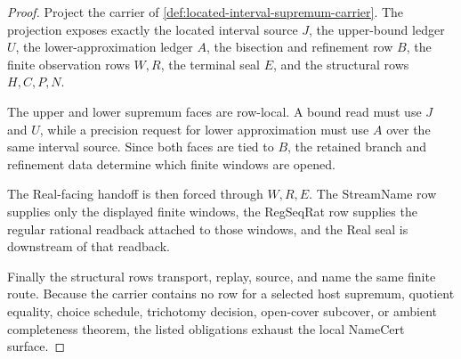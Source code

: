 \begin{proof}
Project the carrier of \autoref{def:located-interval-supremum-carrier}. The projection exposes exactly the located interval source $J$, the upper-bound ledger $U$, the lower-approximation ledger $A$, the bisection and refinement row $B$, the finite observation rows $W,R$, the terminal seal $E$, and the structural rows $H,C,P,N$.

The upper and lower supremum faces are row-local. A bound read must use $J$ and $U$, while a precision request for lower approximation must use $A$ over the same interval source. Since both faces are tied to $B$, the retained branch and refinement data determine which finite windows are opened.

The Real-facing handoff is then forced through $W,R,E$. The StreamName row supplies only the displayed finite windows, the RegSeqRat row supplies the regular rational readback attached to those windows, and the Real seal is downstream of that readback.

Finally the structural rows transport, replay, source, and name the same finite route. Because the carrier contains no row for a selected host supremum, quotient equality, choice schedule, trichotomy decision, open-cover subcover, or ambient completeness theorem, the listed obligations exhaust the local NameCert surface.
\end{proof}


